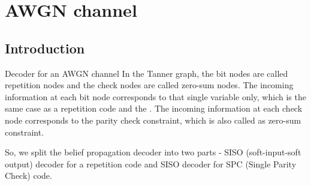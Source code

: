 
\section{AWGN channel} 
\subsection{Introduction} 
\begin{frame}{Decoder for an AWGN channel}
In the Tanner graph, the bit nodes are called repetition nodes and the check nodes are called zero-sum nodes. The incoming information at each bit node corresponds to that single variable only, which is the same case as a repetition code and the . The incoming information at each check node corresponds to the parity check constraint, which is also called as zero-sum constraint.\newline

So, we split the belief propagation decoder into two parts - SISO (soft-input-soft output) decoder for a repetition code and SISO decoder for SPC (Single Parity Check) code.
\end{frame}

